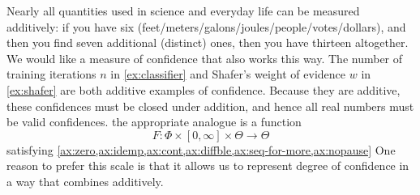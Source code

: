 


Nearly all quantities used in science 
and everyday life
can be measured additively:
if you have six (feet/meters/galons/joules/people/votes/dollars), 
and then you find seven additional (distinct) ones, then you have thirteen altogether. 
We would like a measure of confidence that also works this way.
The number of training iterations $n$ in \cref{ex:classifier}
and Shafer's weight of evidence $w$ in \cref{ex:shafer}
are both additive examples of confidence.
Because they are additive,
these confidences must be closed under addition, and hence
all real numbers must be valid confidences.
the appropriate analogue is a function
\begin{equation}
	F : \Phi \times [0, \infty] \times \Theta \to \Theta
	\label{eq:zero-inf-form}
\end{equation}
satisfying 
\cref{ax:zero,ax:idemp,ax:cont,ax:diffble,ax:seq-for-more,ax:nopause}
One reason to prefer this scale is that it 
allows us to represent degree of confidence in a way that combines additively. 

